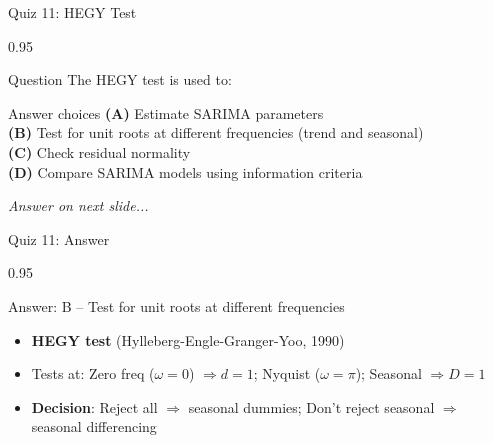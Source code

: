 \documentclass[9pt, aspectratio=169, t]{beamer}
\begin{document}
\begin{frame}{Quiz 11: HEGY Test}
    \begin{cminipage}{0.95\textwidth}
    \begin{alertblock}{Question}
        The HEGY test is used to:
    \end{alertblock}

    \vspace{0.4cm}

    \begin{block}{Answer choices}
        \textcolor{MainBlue}{\textbf{(A)}} Estimate SARIMA parameters\\[3pt]
        \textcolor{MainBlue}{\textbf{(B)}} Test for unit roots at different frequencies (trend and seasonal)\\[3pt]
        \textcolor{MainBlue}{\textbf{(C)}} Check residual normality\\[3pt]
        \textcolor{MainBlue}{\textbf{(D)}} Compare SARIMA models using information criteria
    \end{block}

    \vspace{0.5cm}

    \begin{center}
        \textit{Answer on next slide...}
    \end{center}
    \end{cminipage}
\end{frame}

\begin{frame}{Quiz 11: Answer}
    \begin{cminipage}{0.95\textwidth}
    \begin{exampleblock}{Answer: B -- Test for unit roots at different frequencies}
        \begin{itemize}
            \item \textbf{HEGY test} (Hylleberg-Engle-Granger-Yoo, 1990)
            \item Tests at: Zero freq ($\omega = 0$) $\Rightarrow d = 1$; Nyquist ($\omega = \pi$); Seasonal $\Rightarrow D = 1$
            \item \textbf{Decision}: Reject all $\Rightarrow$ seasonal dummies; Don't reject seasonal $\Rightarrow$ seasonal differencing
        \end{itemize}
    \end{exampleblock}

    \end{cminipage}
\end{frame}
\end{document}
